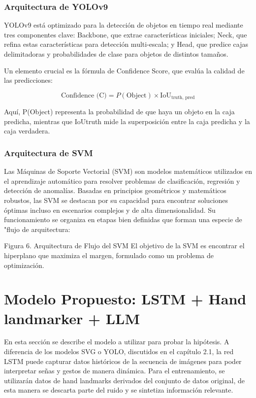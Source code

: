 \documentclass{article}
\begin{document}
\subsubsection{Arquitectura de YOLOv9}

YOLOv9 está optimizado para la detección de objetos en tiempo real mediante tres componentes clave: Backbone, que extrae características iniciales; Neck, que refina estas características para detección multi-escala; y Head, que predice cajas delimitadoras y probabilidades de clase para objetos de distintos tamaños.

Un elemento crucial es la fórmula de Confidence Score, que evalúa la calidad de las predicciones:

\[
\text{Confidence (C)} = P(\text{Object}) \times \text{IoU}_{\text{truth, pred}}
\]

Aquí, P(Object) representa la probabilidad de que haya un objeto en la caja predicha, mientras que IoUtruth mide la superposición entre la caja predicha y la caja verdadera.

\subsubsection{Arquitectura de SVM}

Las Máquinas de Soporte Vectorial (SVM) son modelos matemáticos utilizados en el aprendizaje automático para resolver problemas de clasificación, regresión y detección de anomalías. Basadas en principios geométricos y matemáticos robustos, las SVM se destacan por su capacidad para encontrar soluciones óptimas incluso en escenarios complejos y de alta dimensionalidad.  Su funcionamiento se organiza en etapas bien definidas que forman una especie de "flujo de arquitectura:

Figura 6. Arquitectura de Flujo del SVM
El objetivo de la SVM es encontrar el hiperplano que maximiza el margen, formulado como un problema de optimización.


\section{Modelo Propuesto: LSTM + Hand landmarker + LLM}

En esta sección se describe el modelo a utilizar para probar la hipótesis. A diferencia de los modelos SVG o YOLO, discutidos en el capítulo 2.1, la red LSTM puede capturar datos históricos de la secuencia de imágenes para poder interpretar señas y gestos de manera dinámica. Para el entrenamiento, se utilizarán datos de hand landmarks derivados del conjunto de datos original, de esta manera se descarta parte del ruido y se sintetiza información relevante.
\end{document}
